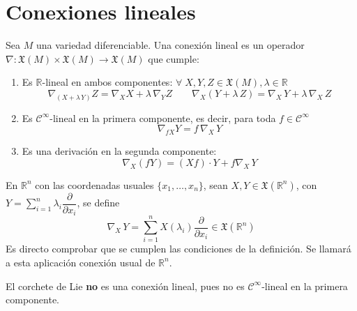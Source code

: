\section{Conexiones lineales}

\begin{defi}
Sea $M$ una variedad diferenciable. Una conexión lineal es un operador $\nabla:\mathfrak{X}(M) \times \mathfrak{X}(M) \longrightarrow \mathfrak X(M)$ que cumple:
\begin{enumerate}
    \item Es $\mathbb{R}$-lineal en ambos componentes: $\forall \;X, Y,Z \in \mathfrak{X}(M),\lambda \in \mathbb{R}$ $$\nabla_{(X + \lambda\,Y)}Z = \nabla_X X + \lambda\,\nabla_Y Z \qquad \nabla_X(Y + \lambda\,Z) = \nabla_X\,Y + \lambda\,\nabla_X\,Z$$
    \item Es $\mathcal{C}^{\infty}$-lineal en la primera componente, es decir, para toda $f\in \mathcal{C}^{\infty}$ $$\nabla_{fX}Y = f \,\nabla_X\,Y$$
    \item Es una derivación en la segunda componente: $$\nabla_X(fY) = (Xf)\cdot Y + f\nabla_X\,Y$$
\end{enumerate}
\end{defi}

\begin{ejem}
En $\mathbb{R}^n$ con las coordenadas usuales $\{x_1,\dots,x_n\}$, sean $X,Y \in \mathfrak{X}(\mathbb{R}^n)$, con $\displaystyle Y = \sum_{i=1}^n \lambda_i \dfrac{\partial}{\partial x_i}$, se define
$$\nabla_X\,Y = \sum_{i=1}^n X(\lambda_i)\dfrac{\partial}{\partial x_i} \in \mathfrak{X}(\mathbb{R}^n)$$
Es directo comprobar que se cumplen las condiciones de la definición. Se llamará a esta aplicación conexión usual de $\mathbb{R}^n$.
\end{ejem}

\begin{ejem}
El corchete de Lie \textbf{no} es una conexión lineal, pues no es $\mathcal{C}^{\infty}$-lineal en la primera componente.
\end{ejem}

